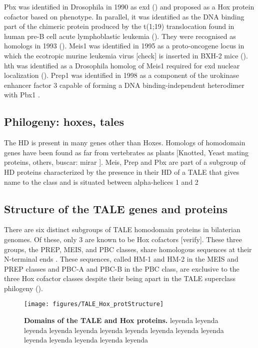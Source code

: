 Pbx was identified in Drosophila in 1990 as \ac{exd} (\cite{Peifer1990}) and proposed as a Hox protein cofactor based on phenotype. In parallel, it was identified as the DNA binding part of the chimeric protein produced by the t(1;19) translocation found in human pre-B cell acute lymphoblastic leukemia (\cite{Kamps1990}). They were recognised as homologs in 1993 (\cite{Rauskolb1993}).
Meis1 was identified in 1995 as a proto-oncogene locus in which the ecotropic murine leukemia virus [check] is inserted in BXH-2 mice (\cite{Moskow1995}). \ac{hth} was identified as a Drosophila homolog of Meis1 required for \ac{exd} nuclear localization (\cite{Rauskolb1995, Rieckhof1997}).
Prep1 was identified in 1998 as a component of the urokinase enhancer factor 3 capable of forming a DNA binding-independent heterodimer with Pbx1 \cite{Berthelsen1998}.

\subsection{Philogeny: hoxes, tales}

The \ac{HD} is present in many genes other than Hoxes. Homologs of homodomain genes have been found as far from vertebrates as plants [Knotted, Yeast mating proteins, others, buscar: mirar \cite{Burglin1997}]. Meis, Prep and Pbx are part of a subgroup of \ac{HD} proteins characterized by the presence in their \ac{HD} of a \ac{TALE} that gives name to the class and is situated between alpha-helices 1 and 2 \cite{Bertolino1995, Burglin1997, Mukherjee2007, Moens2006}

\subsection{Structure of the TALE genes and proteins}
	
There are six distinct subgroups of \ac{TALE} homodomain proteins in bilaterian genomes. Of these, only 3 are known to be Hox cofactors [verify]. These three groups, the PREP, MEIS, and PBC classes, share homologous sequences at their N-terminal ends \cite{Burglin1998}. These sequences, called HM-1 and HM-2 in the MEIS and PREP classes and PBC-A and PBC-B in the PBC class, are exclusive to the three Hox cofactor classes despite their being apart in the \ac{TALE} superclass philogeny (\cite{Mukherjee2007}).

\begin{figure}[]
  
  \centering
  \label{fig:TALE_Hox_protStructure}
  \texttt{[image: figures/TALE\_Hox\_protStructure]}
  \caption[Domains of the TALE and Hox proteins]{\textbf{Domains of the TALE and Hox proteins.} leyenda leyenda leyenda leyenda leyenda leyenda leyenda leyenda leyenda leyenda leyenda leyenda leyenda leyenda leyenda}
\end{figure}

